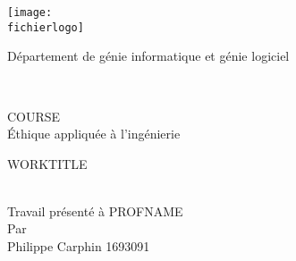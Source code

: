 \documentclass[12pt,titlepage]{article}
\newcommand{\letitre}{WORKTITLE\\}
\newcommand{\presentea}{PROFNAME\\}
\newcommand{\fichierlogo}{logo_poly.pdf}
\newcommand{\organisation}{Département de génie informatique et génie logiciel \\ }
\newcommand{\lenumcours}{COURSE\\}
\newcommand{\letitrecours}{Éthique appliquée à l'ingénierie}
\newcommand{\lauteur}{Philippe Carphin 1693091}
\begin{document}
\begin{titlepage}

\parbox[c]{1in}{\texttt{[image: \\fichierlogo]}}
\hfill \parbox[c]{3in}{\Large\raggedleft\organisation} \\
%
%
\begin{center}
\vfill
%
%
%
\large
\lenumcours
\letitrecours
%
%
\vfill
%
%
\parbox[b]{0.6\textwidth}{\center\letitre}\\
%
{\small Travail présenté à
\presentea}
%
\vfill
Par\\
\lauteur

\end{center}
\end{titlepage}
\end{document}
